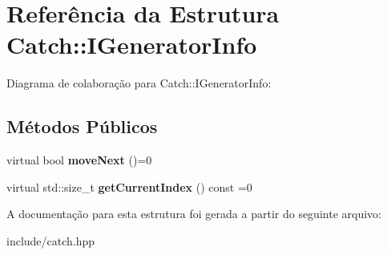 \hypertarget{structCatch_1_1IGeneratorInfo}{}\section{Referência da Estrutura Catch\+:\+:I\+Generator\+Info}
\label{structCatch_1_1IGeneratorInfo}


Diagrama de colaboração para Catch\+:\+:I\+Generator\+Info\+:
\subsection*{Métodos Públicos}
\begin{DoxyCompactItemize}
\item 
virtual bool {\bfseries move\+Next} ()=0\hypertarget{structCatch_1_1IGeneratorInfo_a2b86711ca7009903edfe27ed62b515ef}{}\label{structCatch_1_1IGeneratorInfo_a2b86711ca7009903edfe27ed62b515ef}

\item 
virtual std\+::size\+\_\+t {\bfseries get\+Current\+Index} () const =0\hypertarget{structCatch_1_1IGeneratorInfo_a6a0dca712d31f6849fd9447b1344673a}{}\label{structCatch_1_1IGeneratorInfo_a6a0dca712d31f6849fd9447b1344673a}

\end{DoxyCompactItemize}


A documentação para esta estrutura foi gerada a partir do seguinte arquivo\+:\begin{DoxyCompactItemize}
\item 
include/catch.\+hpp\end{DoxyCompactItemize}
